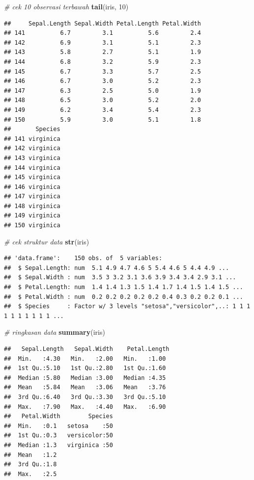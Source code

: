 \documentclass[]{book}
\newenvironment{Shaded}{\begin{snugshade}}{\end{snugshade}}
\newcommand{\CommentTok}[1]{\textcolor[rgb]{0.56,0.35,0.01}{\textit{#1}}}
\newcommand{\DecValTok}[1]{\textcolor[rgb]{0.00,0.00,0.81}{#1}}
\newcommand{\KeywordTok}[1]{\textcolor[rgb]{0.13,0.29,0.53}{\textbf{#1}}}
\newcommand{\NormalTok}[1]{#1}
\theoremstyle{definition}
\theoremstyle{definition}
\theoremstyle{definition}
\theoremstyle{remark}
\begin{document}
\begin{Shaded}
\begin{Highlighting}[]
\CommentTok{# cek 10 observasi terbawah}
\KeywordTok{tail}\NormalTok{(iris, }\DecValTok{10}\NormalTok{)}
\end{Highlighting}
\end{Shaded}

\begin{verbatim}
##     Sepal.Length Sepal.Width Petal.Length Petal.Width
## 141          6.7         3.1          5.6         2.4
## 142          6.9         3.1          5.1         2.3
## 143          5.8         2.7          5.1         1.9
## 144          6.8         3.2          5.9         2.3
## 145          6.7         3.3          5.7         2.5
## 146          6.7         3.0          5.2         2.3
## 147          6.3         2.5          5.0         1.9
## 148          6.5         3.0          5.2         2.0
## 149          6.2         3.4          5.4         2.3
## 150          5.9         3.0          5.1         1.8
##       Species
## 141 virginica
## 142 virginica
## 143 virginica
## 144 virginica
## 145 virginica
## 146 virginica
## 147 virginica
## 148 virginica
## 149 virginica
## 150 virginica
\end{verbatim}

\begin{Shaded}
\begin{Highlighting}[]
\CommentTok{# cek struktur data}
\KeywordTok{str}\NormalTok{(iris)}
\end{Highlighting}
\end{Shaded}

\begin{verbatim}
## 'data.frame':    150 obs. of  5 variables:
##  $ Sepal.Length: num  5.1 4.9 4.7 4.6 5 5.4 4.6 5 4.4 4.9 ...
##  $ Sepal.Width : num  3.5 3 3.2 3.1 3.6 3.9 3.4 3.4 2.9 3.1 ...
##  $ Petal.Length: num  1.4 1.4 1.3 1.5 1.4 1.7 1.4 1.5 1.4 1.5 ...
##  $ Petal.Width : num  0.2 0.2 0.2 0.2 0.2 0.4 0.3 0.2 0.2 0.1 ...
##  $ Species     : Factor w/ 3 levels "setosa","versicolor",..: 1 1 1 1 1 1 1 1 1 1 ...
\end{verbatim}

\begin{Shaded}
\begin{Highlighting}[]
\CommentTok{# ringkasan data}
\KeywordTok{summary}\NormalTok{(iris)}
\end{Highlighting}
\end{Shaded}

\begin{verbatim}
##   Sepal.Length   Sepal.Width    Petal.Length 
##  Min.   :4.30   Min.   :2.00   Min.   :1.00  
##  1st Qu.:5.10   1st Qu.:2.80   1st Qu.:1.60  
##  Median :5.80   Median :3.00   Median :4.35  
##  Mean   :5.84   Mean   :3.06   Mean   :3.76  
##  3rd Qu.:6.40   3rd Qu.:3.30   3rd Qu.:5.10  
##  Max.   :7.90   Max.   :4.40   Max.   :6.90  
##   Petal.Width        Species  
##  Min.   :0.1   setosa    :50  
##  1st Qu.:0.3   versicolor:50  
##  Median :1.3   virginica :50  
##  Mean   :1.2                  
##  3rd Qu.:1.8                  
##  Max.   :2.5
\end{verbatim}
\end{document}
